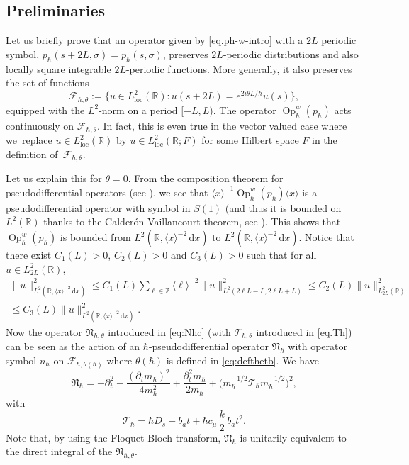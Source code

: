 \documentclass[10pt]{amsart}
\let\sep:
\newcommand{\rd}{\,\mathrm{d}}
\newcommand{\loc}{\mathrm{loc}}
\DeclareMathOperator{\Op}{Op}
\theoremstyle{plain}
\theoremstyle{definition}
\newcommand{\R}{\mathbb{R}}
\begin{document}
\subsection{Preliminaries}\label{s-sec.p}
Let us briefly prove that an operator given by \eqref{eq.ph-w-intro} with a $2L$ periodic symbol, $p_{\hbar}(s+2L,\sigma)=p_{\hbar}(s,\sigma)$, preserves $2L$-periodic distributions and also locally square integrable $2L$-periodic functions. More generally, it also preserves the set of functions
\begin{equation}\label{eq.Fthetah}
\mathscr{F}_{\hbar,\theta}:=\{u\in L^2_{\loc}(\mathbb{R}) \sep u(s+2L)=e^{2i\theta L/\hbar}u(s)\},
\end{equation}
equipped with the $L^2$-norm on a period $[-L,L)$. The operator $\Op_\hbar^w(p_\hbar)$ acts \hbox{continuously} on $\mathscr{F}_{\hbar,\theta}$.
In fact, this is even true in the vector valued case where we~replace $u\in L^2_{\loc}(\mathbb{R})$ by $u\in L^2_{\loc}(\mathbb{R};F)$ for some Hilbert space $F$ in the definition of~$\mathscr{F}_{\hbar,\theta}$.

Let us explain this for $\theta=0$.
From the composition theorem for pseudodifferential operators (see \cite[Th.\,4.18]{Zworski}), we see that $\langle x\rangle^{-1}\Op_\hbar^w(p_\hbar)\langle x\rangle$ is a pseudodifferential operator with symbol in $S(1)$ (and thus it is bounded on $L^2(\R)$ thanks to the Calderón-Vaillancourt theorem, see \cite[Th.\,4.23]{Zworski}). This shows that $\Op_\hbar^w(p_\hbar)$ is bounded from $L^2(\R,\langle x\rangle^{-2}\rd x)$ to $L^2(\R,\langle x\rangle^{-2}\rd x)$. Notice that there exist $C_1(L)>0$, $C_2(L)>0$ and $C_3(L)>0$ such that for all $u\in L^2_{2L}(\R)$,
\begin{multline*}
\|u\|^2_{L^2(\R,\langle x\rangle^{-2}\rd x)} \leq C_1(L) \sum_{\ell \in \mathbb Z} \langle\ell\rangle^{-2} \| u\|^2_{L^2(2 \ell L - L ,2\ell L + L)} \leq C_2(L) \|u\|^2_{L^2_{2L}(\R)}\\
\leq C_3(L)\|u\|^2_{L^2(\R,\langle x\rangle^{-2}\rd x)} .
\end{multline*}
Now the operator $\mathfrak{N}_{\hbar,\theta}$ introduced in \eqref{eq:Nhc} (with $\mathcal T_{\hbar,\theta}$ introduced in \eqref{eq.Th}) can be seen as the action of an $\hbar$-pseudodifferential operator $\mathfrak{N}_\hbar$ with operator symbol $n_{\hbar}$ on $\mathscr{F}_{\hbar,\theta(\hbar)}$ where $\theta(\hbar)$ is defined in \eqref{eq:defthetb}. We have
\begin{equation}\label{eq:N0}
\mathfrak N_{\hbar}=-\partial^2_t-\frac{(\partial_tm_\hbar)^2}{4m^2_\hbar}+\frac{\partial^2_tm_\hbar}{2m_\hbar}+\bigl(m_\hbar^{-1/2} \mathcal T_{\hbar} m_\hbar^{-1/2}\bigr)^2,
\end{equation}
with
\[
\mathcal T_{\hbar}= \hbar D_s-b_at+\hbar c_\mu\,\frac{k}{2}\,b_at^2.
\]
Note that, by using the Floquet-Bloch transform, $\mathfrak{N}_\hbar$ is unitarily equivalent to the direct integral of the $\mathfrak{N}_{\hbar,\theta}$.
\end{document}
